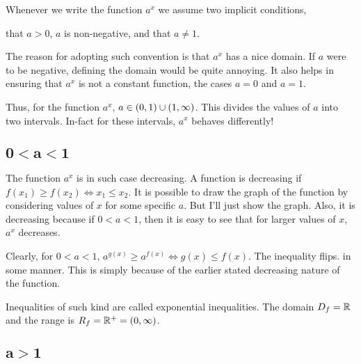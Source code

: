 Whenever we write the function \(a^x\) we assume two implicit conditions, \begin{inparaenum}[1)]
    \ii that \(a > 0\), \(a\) is non-negative,
    \ii and that \(a \ne 1\).
\end{inparaenum}

The reason for adopting such convention is that \(a^x\) has a nice domain. If \(a\) were to
be negative, defining the domain would be quite annoying. It also helps in ensuring that 
\(a^x\) is not a constant function, the cases \(a = 0\) and \(a = 1\).

Thus, for the function \(a^x\), \(a \in \left(0,1\right) \cup \left(1, \infty\right)\). This
divides the values of \(a\) into two intervals. In-fact for these intervals, \(a^x\) behaves 
differently!

\subsection[Case I]{\(\mathbf{0 < a < 1}\)}

The function \(a^x\) is in such case decreasing. A function is decreasing if \(f(x_1) \ge f(x_2)
\iff x_1 \le x_2\). It is possible to draw the graph of the function by considering
values of \(x\) for some specific \(a\). But I'll just show the graph. Also, it is decreasing 
because if \(0 < a < 1\), then it is easy to see that for larger values of \(x\), \(a^x\) decreases.

\begin{figure}[H]
    \centering
\end{figure}

 Clearly, for \(0 < a < 1\), \(a^{g(x)} \ge a^{f(x)} \iff g(x) \le f(x)\). The inequality flips. 
 in some manner. This is simply because of the earlier stated decreasing nature of the function.
 
 Inequalities of such kind are called exponential inequalities. The domain \(D_f = \mathbb R\) and
 the range is \(R_f = \mathbb R^+ = (0, \infty)\). 

 \subsection[Case II]{\(\mathbf{a > 1}\)}

